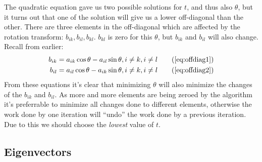 \documentclass[a4paper]{revtex4}
\begin{document}
The quadratic equation gave us two possible solutions for $t$, and thus also
$\theta$, but it turns out that one of the solution will give us a lower
off-diagonal than the other. There are three elements in the off-diagonal which
are affected by the rotation transform: $b_{ik}, b_{il}, b_{kl}$. $b_{kl}$ is
zero for this $\theta$, but $b_{ik}$ and $b_{il}$ will also change. Recall
from earlier:
\begin{align}
  b_{ik} &= a_{ik} \cos \theta - a_{il} \sin \theta, i \neq k, i \neq l
  \tag{\ref{eq:offdiag1}}\\
  b_{il} &= a_{il} \cos \theta - a_{ik} \sin \theta, i \neq k, i \neq l
  \tag{\ref{eq:offdiag2}}
\end{align}
From these equations it's clear that minimizing $\theta$ will also
minimize the changes of the $b_{ik}$ and $b_{il}$. As more and more elements
are being zeroed by the algorithm it's preferrable to minimize all changes
done to different elements, otherwise the work done by one iteration will
``undo'' the work done by a previous iteration. Due to this we should choose
the \emph{lowest} value of $t$.

\subsection{Eigenvectors}
\end{document}
